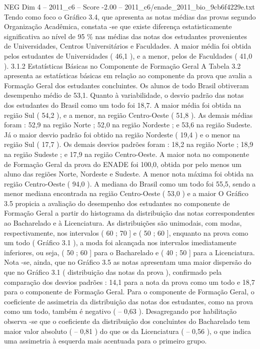 \begin{textsample}{NEG Dim 4 – 2011\_c6 – Score -2.00 – 2011\_c6/enade\_2011\_bio\_9cb6f4229e.txt}
Tendo como foco o Gráfico 3.4, que apresenta as notas médias das provas segundo Organização Acadêmica, constata -se que existe diferença estatisticamente significativa ao nível de 95 \% nas médias das notas dos estudantes provenientes de Universidades, Centros Universitários e Faculdades.
A maior média foi obtida pelos estudantes de Universidades ( 46,1 ), e a menor, pelos de Faculdades ( 41,0 ). 3.1.2 Estatísticas Básicas no Componente de Formação Geral A Tabela 3.2 apresenta as estatísticas básicas em relação ao componente da prova que avalia a Formação Geral dos estudantes concluintes.
Os alunos de todo Brasil obtiveram desempenho médio de 53,1.
Quanto à variabilidade, o desvio padrão das notas dos estudantes do Brasil como um todo foi 18,7.
A maior média foi obtida na região Sul ( 54,2 ), e a menor, na região Centro-Oeste ( 51,8 ).
As demais médias foram : 52,9 na região Norte ; 52,0 na região Nordeste ; e 53,6 na região Sudeste.
Já o maior desvio padrão foi obtido na região Nordeste ( 19,4 ) e o menor na região Sul ( 17,7 ).
Os demais desvios padrões foram : 18,2 na região Norte ; 18,9 na região Sudeste ; e 17,9 na região Centro-Oeste.
A maior nota no componente de Formação Geral da prova do ENADE foi 100,0, obtida por pelo menos um aluno das regiões Norte, Nordeste e Sudeste.
A menor nota máxima foi obtida na região Centro-Oeste ( 94,0 ).
A mediana do Brasil como um todo foi 55,5, sendo a menor mediana encontrada na região Centro-Oeste ( 53,0 ) e a maior O Gráfico 3.5 propicia a avaliação do desempenho dos estudantes no componente de Formação Geral a partir do histograma da distribuição das notas correspondentes ao Bacharelado e à Licenciatura.
As distribuições são unimodais, com modas, respectivamente, nos intervalos ( 60 ; 70 ] e ( 50 ; 60 ], enquanto na prova como um todo ( Gráfico 3.1 ), a moda foi alcançada nos intervalos imediatamente inferiores, ou seja, ( 50 ; 60 ] para o Bacharelado e ( 40 ; 50 ] para a Licenciatura.
Nota -se, ainda, que no Gráfico 3.5 as notas apresentam uma maior dispersão do que no Gráfico 3.1 ( distribuição das notas da prova ), confirmado pela comparação dos desvios padrões : 14,1 para a nota da prova como um todo e 18,7 para o componente de Formação Geral.
Para o componente de Formação Geral, o coeficiente de assimetria da distribuição das notas dos estudantes, como na prova como um todo, também é negativo ( – 0,63 ).
Desagregando por habilitação observa -se que o coeficiente da distribuição dos concluintes do Bacharelado tem maior valor absoluto ( – 0,81 ) do que os da Licenciatura ( – 0,56 ), o que indica uma assimetria à esquerda mais acentuada para o primeiro grupo.

\end{textsample}
